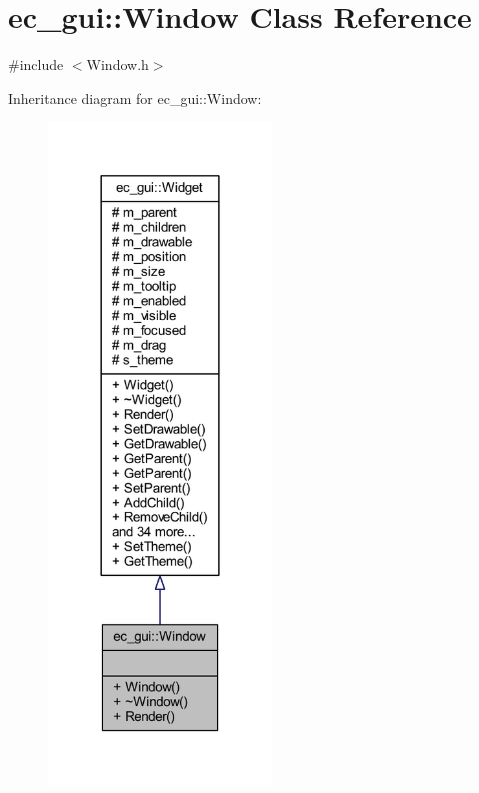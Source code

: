 \hypertarget{classec__gui_1_1_window}{}\section{ec\+\_\+gui\+:\+:Window Class Reference}
\label{classec__gui_1_1_window}


{\ttfamily \#include $<$Window.\+h$>$}



Inheritance diagram for ec\+\_\+gui\+:\+:Window\+:\nopagebreak
\begin{figure}[H]
\begin{center}
\leavevmode
\includegraphics[width=168pt]{classec__gui_1_1_window__inherit__graph}
\end{center}
\end{figure}


